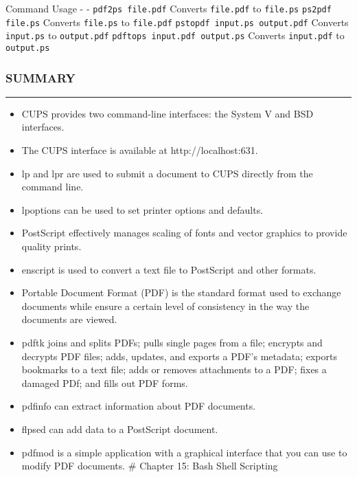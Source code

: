 Command \textbar{} Usage - \textbar{} - \texttt{pdf2ps file.pdf}
\textbar{} Converts \texttt{file.pdf} to \texttt{file.ps}
\texttt{ps2pdf file.ps} \textbar{} Converts \texttt{file.ps} to
\texttt{file.pdf} \texttt{pstopdf input.ps output.pdf} \textbar{}
Converts \texttt{input.ps} to \texttt{output.pdf}
\texttt{pdftops input.pdf output.ps} \textbar{} Converts
\texttt{input.pdf} to \texttt{output.ps}

\subsubsection{SUMMARY}\label{summary-12}

\begin{center}\rule{3in}{0.4pt}\end{center}

\begin{itemize}
\itemsep1pt\parskip0pt
\item
  CUPS provides two command-line interfaces: the System V and BSD
  interfaces.
\item
  The CUPS interface is available at http://localhost:631.
\item
  lp and lpr are used to submit a document to CUPS directly from the
  command line.
\item
  lpoptions can be used to set printer options and defaults.
\item
  PostScript effectively manages scaling of fonts and vector graphics to
  provide quality prints.
\item
  enscript is used to convert a text file to PostScript and other
  formats.
\item
  Portable Document Format (PDF) is the standard format used to exchange
  documents while ensure a certain level of consistency in the way the
  documents are viewed.
\item
  pdftk joins and splits PDFs; pulls single pages from a file; encrypts
  and decrypts PDF files; adds, updates, and exports a PDF's metadata;
  exports bookmarks to a text file; adds or removes attachments to a
  PDF; fixes a damaged PDf; and fills out PDF forms.
\item
  pdfinfo can extract information about PDF documents.
\item
  flpsed can add data to a PostScript document.
\item
  pdfmod is a simple application with a graphical interface that you can
  use to modify PDF documents. \# Chapter 15: Bash Shell Scripting
\end{itemize}

